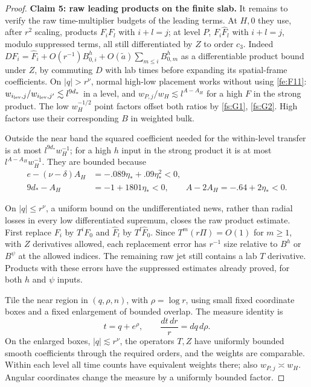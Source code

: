 \begin{proof}
\par\medskip\noindent\textbf{Claim 5: raw leading products on the finite slab.}\label{fs:claim-raw}\quad
It remains to verify the raw time-multiplier budgets of the leading terms. At \(H,0\) they use, after \(r^2\) scaling, products \(F_i F_l\) with \(i+l=j\); at level \(P\), \(F_i\widehat F_l\) with \(i+l=j\), modulo suppressed terms, all still differentiated by \(Z\) to order \(c_3\). Indeed
\(D F_i=\widehat F_i+O(r^{-1})B^h_{0,i}+O(\widetilde a)\sum_{m\le i}B^h_{0,m}\)
as a differentiable product bound under \(Z\), by commuting \(D\) with lab times before expanding its spatial-frame coefficients. On \(|q|>r^\nu\), normal high-low placement works without using \eqref{fe:F11}: \(w_{i_{\rm lev},j}/w_{i_{\rm lev},j'}\lesssim l^{9d_*}\) in a level, and \(w_{P,j}/w_H\lesssim l^{A-A_H}\) for a high \(F\) in the strong product. The low \(w_H^{-1/2}\) point factors offset both ratios by \eqref{fs:G1}, \eqref{fs:G2}. High factors use their corresponding \(B\) in weighted bulk.

Outside the near band the squared coefficient needed for the
within-level transfer is at most $l^{9d_*}w_H^{-1}$; for a high
$h$ input in the strong product it is at most
$l^{A-A_H}w_H^{-1}$.  They are bounded because
\[
 \begin{split}
 e-(\nu-\delta)A_H&=-.089\eta_*+.09\eta_*^2<0,\\
 9d_*-A_H&=-1+1801\eta_*<0,\qquad
 A-2A_H=-.64+2\eta_*<0 .
 \end{split}
\]

On $|q|\le r^\nu$, a uniform bound on the undifferentiated news,
rather than radial losses in every low differentiated supremum, closes
the raw product estimate.  First replace $F_i$ by $T^iF_0$ and
$\widehat F_l$ by $T^l\widehat F_0$.  Since
$T^m(r\Pi)=O(1)$ for $m\ge1$, with $Z$ derivatives allowed, each
replacement error has $r^{-1}$ size relative to $B^h$ or $B^\psi$
at the allowed indices.  The remaining raw jet still contains a lab
$T$ derivative.  Products with these errors have the suppressed
estimates already proved, for both $h$ and $\psi$ inputs.

Tile the near region in $(q,\rho,n)$, with $\rho=\log r$, using
small fixed coordinate boxes and a fixed enlargement of bounded
overlap.  The measure identity is
\begin{equation}\label{fs:tile-measure}
 t=q+e^\rho,\qquad \frac{dt\,dr}{r}=dq\,d\rho.
\end{equation}
On the enlarged boxes, $|q|\lesssim r^\nu$, the operators $T,Z$
have uniformly bounded smooth coefficients through the required
orders, and the weights are comparable.  Within each level all time
counts have equivalent weights there; also $w_{P,j}\asymp w_H$.
Angular coordinates change the measure by a uniformly bounded factor.


\end{proof}

